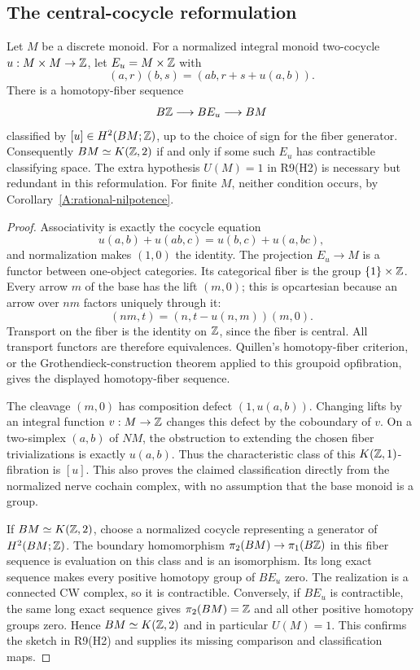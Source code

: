 \subsection{The central-cocycle reformulation}
\begin{proposition}\label{prop:E-cocycle}
Let $M$ be a discrete monoid. For a normalized integral monoid two-cocycle
$u:M\times M\to\mathbb Z$, let $E_u=M\times\mathbb Z$ with
\[
 (a,r)(b,s)=(ab,r+s+u(a,b)).
\]
There is a homotopy-fiber sequence
\[
 B\mathbb Z\longrightarrow BE_u\longrightarrow BM
\]
classified by $[u]\in H^2(BM;\mathbb Z)$, up to the choice of sign for the fiber
generator. Consequently $BM\simeq K(\mathbb Z,2)$ if and only if some such $E_u$
has contractible classifying space. The extra hypothesis $U(M)=1$ in R9(H2)
is necessary but redundant in this reformulation. For finite $M$, neither
condition occurs, by Corollary~\ref{A:rational-nilpotence}.
\end{proposition}
\begin{proof}
Associativity is exactly the cocycle equation
\[
 u(a,b)+u(ab,c)=u(b,c)+u(a,bc),
\]
and normalization makes $(1,0)$ the identity. The projection $E_u\to M$
is a functor between one-object categories. Its categorical fiber is the
group $\{1\}\times\mathbb Z$. Every arrow $m$ of the base has the lift $(m,0)$;
this is opcartesian because an arrow over $nm$ factors uniquely through it:
\[
 (nm,t)=(n,t-u(n,m))(m,0).
\]
Transport on the fiber is the identity on $\mathbb Z$, since the fiber is central.
All transport functors are therefore equivalences. Quillen's homotopy-fiber
criterion, or the Grothendieck-construction theorem applied to this groupoid
opfibration, gives the displayed homotopy-fiber sequence.

The cleavage $(m,0)$ has composition defect $(1,u(a,b))$.
Changing lifts by an integral function $v:M\to\mathbb Z$ changes this defect
by the coboundary of $v$. On a two-simplex $(a,b)$ of $NM$, the obstruction
to extending the chosen fiber trivializations is exactly $u(a,b)$.
Thus the characteristic class of this $K(\mathbb Z,1)$-fibration is $[u]$.
This also proves the claimed classification directly from the normalized
nerve cochain complex, with no assumption that the base monoid is a group.

If $BM\simeq K(\mathbb Z,2)$, choose a normalized cocycle representing a generator
of $H^2(BM;\mathbb Z)$. The boundary homomorphism
$\pi_2(BM)\to\pi_1(B\mathbb Z)$ in this fiber sequence is evaluation on this
class and is an isomorphism. Its long exact sequence makes every positive
homotopy group of $BE_u$ zero. The realization is a connected CW complex,
so it is contractible. Conversely, if $BE_u$ is contractible, the same
long exact sequence gives $\pi_2(BM)=\mathbb Z$ and all other positive homotopy
groups zero. Hence $BM\simeq K(\mathbb Z,2)$ and in particular $U(M)=1$.
This confirms the sketch in R9(H2) and supplies its missing comparison and
classification maps.
\end{proof}

